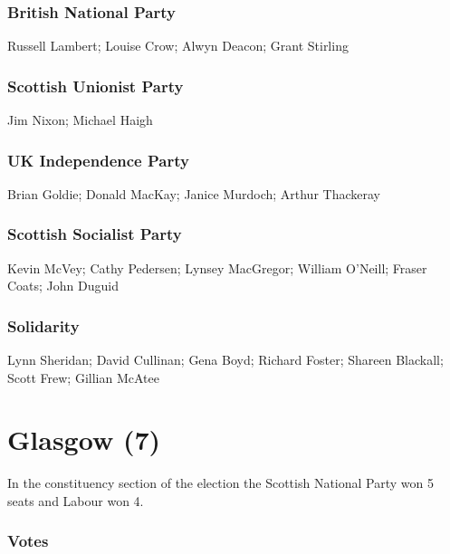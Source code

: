 \begin{resultsiii}
\subsubsection*{British National Party}
Russell Lambert; Louise Crow; Alwyn Deacon; Grant Stirling
\subsubsection*{Scottish Unionist Party}
Jim Nixon; Michael Haigh
\subsubsection*{UK Independence Party}
Brian Goldie; Donald MacKay; Janice Murdoch; Arthur Thackeray
\subsubsection*{Scottish Socialist Party}
Kevin McVey; Cathy Pedersen; Lynsey MacGregor; William O'Neill; Fraser Coats; John Duguid
\subsubsection*{Solidarity}
Lynn Sheridan; David Cullinan; Gena Boyd; Richard Foster; Shareen Blackall; Scott Frew; Gillian McAtee
\end{resultsiii}

\vfill\eject

\section[Glasgow]{Glasgow (7)}

In the constituency section of the election the Scottish National Party won 5 seats and Labour won 4.

\subsubsection*{Votes}

